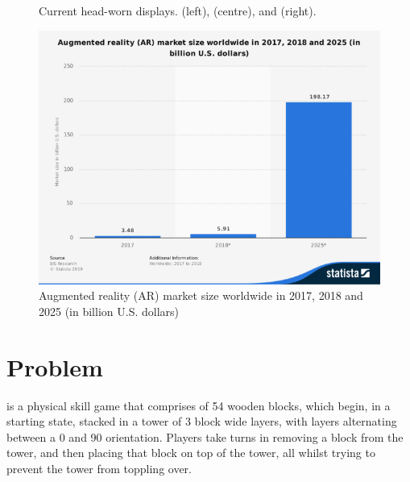 \begin{figure}[ht]
\begin{minipage}{\textwidth}
\begin{minipage}{0.3\textwidth}
     \label{fig:glassee}
\end{minipage}
\caption{Current head-worn displays. \protect{} (left), \protect{} (centre), and \protect{} (right).}
\label{fig:headworndisplays}
\end{minipage}
\end{figure}

\begin{figure}[ht]
    \centering
    \includegraphics[width=0.65\linewidth]{images/proposal/statistic_id897587_augmented-reality-market-size-worldwide-2017-2025}
    \caption{Augmented reality (AR) market size worldwide in 2017, 2018 and 2025 (in billion U.S. dollars) \protect\citep{bisresearch}}
    \label{fig:arstats}
\end{figure}


%
\section{Problem}\label{sec:problem}
%

\jenga{} is a physical skill game that comprises of 54 wooden blocks, which begin, in a starting state, stacked in a tower of 3 block wide layers, with layers alternating between a 0\degree{} and 90\degree{} orientation. Players take turns in removing a block from the tower, and then placing that block on top of the tower, all whilst trying to prevent the tower from toppling over.

